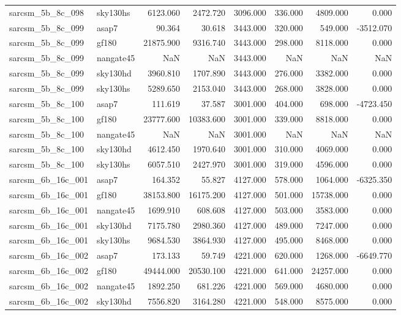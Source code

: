 \begin{tabular}{llrrrrrr}
sarcsm\_5b\_8c\_098 & sky130hs & 6123.060 & 2472.720 & 3096.000 & 336.000 & 4809.000 & 0.000 \\
sarcsm\_5b\_8c\_099 & asap7 & 90.364 & 30.618 & 3443.000 & 320.000 & 549.000 & -3512.070 \\
sarcsm\_5b\_8c\_099 & gf180 & 21875.900 & 9316.740 & 3443.000 & 298.000 & 8118.000 & 0.000 \\
sarcsm\_5b\_8c\_099 & nangate45 & NaN & NaN & 3443.000 & NaN & NaN & NaN \\
sarcsm\_5b\_8c\_099 & sky130hd & 3960.810 & 1707.890 & 3443.000 & 276.000 & 3382.000 & 0.000 \\
sarcsm\_5b\_8c\_099 & sky130hs & 5289.650 & 2153.040 & 3443.000 & 268.000 & 3828.000 & 0.000 \\
sarcsm\_5b\_8c\_100 & asap7 & 111.619 & 37.587 & 3001.000 & 404.000 & 698.000 & -4723.450 \\
sarcsm\_5b\_8c\_100 & gf180 & 23777.600 & 10383.600 & 3001.000 & 339.000 & 8818.000 & 0.000 \\
sarcsm\_5b\_8c\_100 & nangate45 & NaN & NaN & 3001.000 & NaN & NaN & NaN \\
sarcsm\_5b\_8c\_100 & sky130hd & 4612.450 & 1970.640 & 3001.000 & 310.000 & 4069.000 & 0.000 \\
sarcsm\_5b\_8c\_100 & sky130hs & 6057.510 & 2427.970 & 3001.000 & 319.000 & 4596.000 & 0.000 \\
sarcsm\_6b\_16c\_001 & asap7 & 164.352 & 55.827 & 4127.000 & 578.000 & 1064.000 & -6325.350 \\
sarcsm\_6b\_16c\_001 & gf180 & 38153.800 & 16175.200 & 4127.000 & 501.000 & 15738.000 & 0.000 \\
sarcsm\_6b\_16c\_001 & nangate45 & 1699.910 & 608.608 & 4127.000 & 503.000 & 3583.000 & 0.000 \\
sarcsm\_6b\_16c\_001 & sky130hd & 7175.780 & 2980.360 & 4127.000 & 489.000 & 7247.000 & 0.000 \\
sarcsm\_6b\_16c\_001 & sky130hs & 9684.530 & 3864.930 & 4127.000 & 495.000 & 8468.000 & 0.000 \\
sarcsm\_6b\_16c\_002 & asap7 & 173.133 & 59.749 & 4221.000 & 620.000 & 1268.000 & -6649.770 \\
sarcsm\_6b\_16c\_002 & gf180 & 49444.000 & 20530.100 & 4221.000 & 641.000 & 24257.000 & 0.000 \\
sarcsm\_6b\_16c\_002 & nangate45 & 1892.250 & 681.226 & 4221.000 & 569.000 & 4680.000 & 0.000 \\
sarcsm\_6b\_16c\_002 & sky130hd & 7556.820 & 3164.280 & 4221.000 & 548.000 & 8575.000 & 0.000 \\

\end{tabular}
